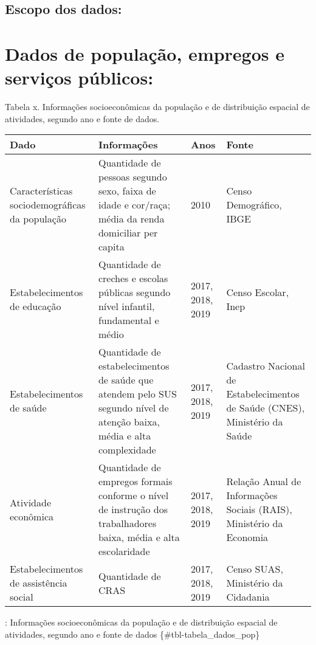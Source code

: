 \documentclass[
  letterpaper,
  DIV=11,
  numbers=noendperiod]{scrreprt}
\begin{document}
\hypertarget{escopo-dos-dados}{%
\subsection*{Escopo dos dados:}\label{escopo-dos-dados}}

\hypertarget{dados-de-populauxe7uxe3o-empregos-e-serviuxe7os-puxfablicos}{%
\section*{Dados de população, empregos e serviços
públicos:}\label{dados-de-populauxe7uxe3o-empregos-e-serviuxe7os-puxfablicos}}

Tabela x. Informações socioeconômicas da população e de distribuição
espacial de atividades, segundo ano e fonte de dados.

\begin{longtable}[]{@{}llll@{}}
\toprule()
Dado & Informações & Anos & Fonte \\
\midrule()
\endhead
Características sociodemográficas da população & Quantidade de pessoas
segundo sexo, faixa de idade e cor/raça; média da renda domiciliar per
capita & 2010 & Censo Demográfico, IBGE \\
Estabelecimentos de educação & Quantidade de creches e escolas públicas
segundo nível infantil, fundamental e médio & 2017, 2018, 2019 & Censo
Escolar, Inep \\
Estabelecimentos de saúde & Quantidade de estabelecimentos de saúde que
atendem pelo SUS segundo nível de atenção baixa, média e alta
complexidade & 2017, 2018, 2019 & Cadastro Nacional de Estabelecimentos
de Saúde (CNES), Ministério da Saúde \\
Atividade econômica & Quantidade de empregos formais conforme o nível de
instrução dos trabalhadores baixa, média e alta escolaridade & 2017,
2018, 2019 & Relação Anual de Informações Sociais (RAIS), Ministério da
Economia \\
Estabelecimentos de assistência social & Quantidade de CRAS & 2017,
2018, 2019 & Censo SUAS, Ministério da Cidadania \\
\bottomrule()
\end{longtable}

: Informações socioeconômicas da população e de distribuição espacial de
atividades, segundo ano e fonte de dados \{\#tbl-tabela\_dados\_pop\}
\end{document}
